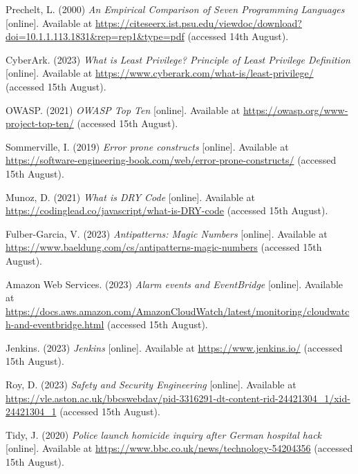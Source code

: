  \noindent [35] Prechelt, L. (2000) \textit{An Empirical Comparison of Seven Programming Languages} [online]. Available at \url{https://citeseerx.ist.psu.edu/viewdoc/download?doi=10.1.1.113.1831&rep=rep1&type=pdf} (accessed 14th August).
 \vspace{0.2cm}

 \noindent [36] CyberArk. (2023) \textit{What is Least Privilege? Principle of Least Privilege Definition} [online]. Available at \url{https://www.cyberark.com/what-is/least-privilege/} (accessed 15th August).
 \vspace{0.2cm}

 \noindent [37] OWASP. (2021) \textit{OWASP Top Ten} [online]. Available at \url{https://owasp.org/www-project-top-ten/} (accessed 15th August).
 \vspace{0.2cm}

 \noindent [38] Sommerville, I. (2019) \textit{Error prone constructs} [online]. Available at \url{https://software-engineering-book.com/web/error-prone-constructs/} (accessed 15th August).
 \vspace{0.2cm}

 \noindent [39] Munoz, D. (2021) \textit{What is DRY Code} [online]. Available at \url{https://codinglead.co/javascript/what-is-DRY-code} (accessed 15th August).
 \vspace{0.2cm}

 \noindent [40] Fulber-Garcia, V. (2023) \textit{Antipatterns: Magic Numbers} [online]. Available at \url{https://www.baeldung.com/cs/antipatterns-magic-numbers} (accessed 15th August).
 \vspace{0.2cm}

 \noindent [41] Amazon Web Services. (2023) \textit{Alarm events and EventBridge} [online]. Available at \url{https://docs.aws.amazon.com/AmazonCloudWatch/latest/monitoring/cloudwatch-and-eventbridge.html} (accessed 15th August).
 \vspace{0.2cm}

 \noindent [42] Jenkins. (2023) \textit{Jenkins} [online]. Available at \url{https://www.jenkins.io/} (accessed 15th August).
 \vspace{0.2cm}

 \noindent [43] Roy, D. (2023) \textit{Safety and Security Engineering} [online]. Available at \url{https://vle.aston.ac.uk/bbcswebdav/pid-3316291-dt-content-rid-24421304_1/xid-24421304_1} (accessed 15th August).
 \vspace{0.2cm}

 \noindent [44] Tidy, J. (2020) \textit{Police launch homicide inquiry after German hospital hack} [online]. Available at \url{https://www.bbc.co.uk/news/technology-54204356} (accessed 15th August).
 \vspace{0.2cm}


